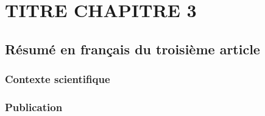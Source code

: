 \chapter{TITRE CHAPITRE 3}
\label{chap3}

\section{Résumé en français du troisième article}

\subsection{Contexte scientifique}

\subsection{Publication}
